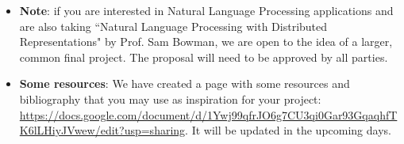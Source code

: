 \documentclass[11pt]{article}
\begin{document}
\begin{itemize}
 \item \textbf{Note}: if you are interested in Natural Language Processing applications and are also taking ``Natural Language Processing with Distributed Representations" by Prof. Sam Bowman, we are open to the idea of a larger, common final project. The proposal will need to be approved by all parties. 


\item \textbf{Some resources}: We have created a page with some resources and bibliography that you may use as inspiration for your project: \url{https://docs.google.com/document/d/1Ywj99qfrJO6g7CU3qi0Gar93GqaqhfTK6lLHiyJVwew/edit?usp=sharing}. It will be updated in the upcoming days.


\end{itemize}
\end{document}
